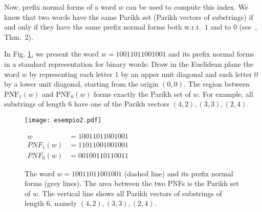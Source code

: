 \documentclass[11pt,a4paper]{llncs}
\newcommand{\PNF}{\mathrm{PNF}}
\begin{document}
Now, prefix normal forms of a word $w$ can be used to compute this index. We know that two words have the same Parikh set (Parikh vectors of substrings) if and only if they have the same prefix normal forms both w.r.t.\ $1$ and to $0$ (see~\cite{FL11}, Thm.~2). 

In Fig. \ref{fig:esempio}, we present the word $w=10011011001001$ and its prefix normal forms in a standard representation for binary words: Draw in the Euclidean plane the word $w$ by representing each letter $1$ by an upper unit diagonal and each letter $0$ by a lower unit diagonal, starting from the origin $(0,0)$. The region between $\PNF_{1}(w)$ and $\PNF_{0}(w)$ forms exactly the Parikh set of $w$. For example, all substrings of length $6$ have one of the Parikh vectors $(4,2),(3,3),(2,4)$. 

\begin{figure}
\begin{minipage}{8cm}
\begin{center}
  \texttt{[image: esempio2.pdf]}
\end{center}
\end{minipage}
\begin{minipage}{6cm}
\end{minipage}
\begin{minipage}{7cm}
\begin{center}
$
\begin{array}{rcl}
w & = 10011011001001\\
PNF_1(w) & = 11011001001001\\
PNF_0(w) & = 00100110110011
\end{array}
$
\end{center}
\end{minipage}
\caption{The word $w=10011011001001$ (dashed line) and its prefix normal forms (grey lines). The area between the two PNFs is the Parikh set of $w$. The vertical line shows all Parikh vectors of substrings of length $6$, namely $(4,2),(3,3),(2,4)$.}\label{fig:esempio}
\end{figure}
\end{document}
